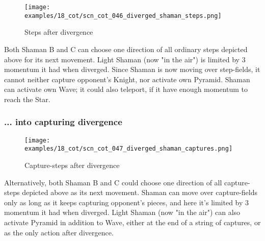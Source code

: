 \vspace*{-1.4\baselineskip}
\noindent
\begin{figure}[!h]
\texttt{[image: examples/18\_cot/scn\_cot\_046\_diverged\_shaman\_steps.png]}
\vspace*{-1.4\baselineskip}
\caption{Steps after divergence}
\label{fig:scn_cot_046_diverged_shaman_steps}
\end{figure}

\vspace*{-0.4\baselineskip}
Both Shaman B and C can choose one direction of all ordinary steps depicted above
for its next movement. Light Shaman (now "in the air") is limited by 3 momentum it
had when diverged. \newline
\indent
Since Shaman is now moving over step-fields, it cannot neither capture opponent's
Knight, nor activate own Pyramid. Shaman can activate own Wave; it could also
teleport, if it have enough momentum to reach the Star.

\clearpage %

\subsubsection*{... into capturing divergence}
\label{sec:Conquest of Tlalocan/Divergence/... into capturing divergence}

\vspace*{-1.4\baselineskip}
\noindent
\begin{figure}[!h]
\texttt{[image: examples/18\_cot/scn\_cot\_047\_diverged\_shaman\_captures.png]}
\vspace*{-1.4\baselineskip}
\caption{Capture-steps after divergence}
\label{fig:scn_cot_047_diverged_shaman_captures}
\end{figure}

\vspace*{-0.4\baselineskip}
Alternatively, both Shaman B and C could choose one direction of all capture-steps
depicted above as its next movement. Shaman can move over capture-fields only as
long as it keeps capturing opponent's pieces, and here it's limited by 3 momentum
it had when diverged. \newline
\indent
Light Shaman (now "in the air") can also activate Pyramid in addition to Wave,
either at the end of a string of captures, or as the only action after divergence.

